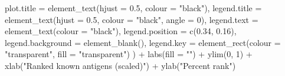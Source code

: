 \documentclass[
  11pt,
  oneside]{book}
\newenvironment{Shaded}{\begin{snugshade}}{\end{snugshade}}
\newcommand{\AttributeTok}[1]{\textcolor[rgb]{0.77,0.63,0.00}{#1}}
\newcommand{\DecValTok}[1]{\textcolor[rgb]{0.00,0.00,0.81}{#1}}
\newcommand{\FloatTok}[1]{\textcolor[rgb]{0.00,0.00,0.81}{#1}}
\newcommand{\FunctionTok}[1]{\textcolor[rgb]{0.00,0.00,0.00}{#1}}
\newcommand{\NormalTok}[1]{#1}
\newcommand{\SpecialCharTok}[1]{\textcolor[rgb]{0.00,0.00,0.00}{#1}}
\newcommand{\StringTok}[1]{\textcolor[rgb]{0.31,0.60,0.02}{#1}}
\begin{document}
\begin{Shaded}
\begin{Highlighting}[]
    \AttributeTok{plot.title =} \FunctionTok{element\_text}\NormalTok{(}\AttributeTok{hjust =} \FloatTok{0.5}\NormalTok{, }\AttributeTok{colour =} \StringTok{"black"}\NormalTok{),}
    \AttributeTok{legend.title =} \FunctionTok{element\_text}\NormalTok{(}\AttributeTok{hjust =} \FloatTok{0.5}\NormalTok{, }\AttributeTok{colour =} \StringTok{"black"}\NormalTok{, }\AttributeTok{angle =} \DecValTok{0}\NormalTok{),}
    \AttributeTok{legend.text =} \FunctionTok{element\_text}\NormalTok{(}\AttributeTok{colour =} \StringTok{"black"}\NormalTok{),}
    \AttributeTok{legend.position =} \FunctionTok{c}\NormalTok{(}\FloatTok{0.34}\NormalTok{, }\FloatTok{0.16}\NormalTok{),}
    \AttributeTok{legend.background =} \FunctionTok{element\_blank}\NormalTok{(),}
    \AttributeTok{legend.key =} \FunctionTok{element\_rect}\NormalTok{(}\AttributeTok{colour =} \StringTok{"transparent"}\NormalTok{, }\AttributeTok{fill =} \StringTok{"transparent"}\NormalTok{)}
\NormalTok{  ) }\SpecialCharTok{+}
  \FunctionTok{labs}\NormalTok{(}\AttributeTok{fill =} \StringTok{""}\NormalTok{) }\SpecialCharTok{+}
  \FunctionTok{ylim}\NormalTok{(}\DecValTok{0}\NormalTok{, }\DecValTok{1}\NormalTok{) }\SpecialCharTok{+}
  \FunctionTok{xlab}\NormalTok{(}\StringTok{"Ranked known antigens (scaled)"}\NormalTok{) }\SpecialCharTok{+}
  \FunctionTok{ylab}\NormalTok{(}\StringTok{"Percent rank"}\NormalTok{)}
\end{Highlighting}
\end{Shaded}
\end{document}
